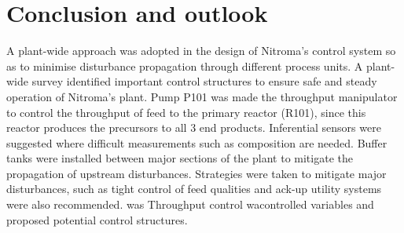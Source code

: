 \section{Conclusion and outlook}
A plant-wide approach was adopted in the design of Nitroma's control system so as to minimise disturbance propagation through different process units. A plant-wide survey identified important control structures to ensure safe and steady operation of Nitroma's plant. Pump P101 was made the throughput manipulator to control the throughput of feed to the primary reactor (R101), since this reactor produces the precursors to all 3 end products. Inferential sensors were suggested where difficult measurements such as composition are needed. Buffer tanks were installed between major sections of the plant to mitigate the propagation of upstream disturbances. Strategies were taken to mitigate major disturbances, such as tight control of feed qualities and ack-up utility systems were also recommended. was Throughput control wacontrolled variables and proposed potential control structures.